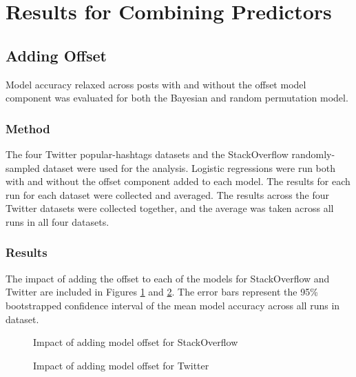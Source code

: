 \documentclass[man,floatsintext,donotrepeattitle]{apa6}
\begin{document}
\section{Results for Combining Predictors}

\subsection{Adding Offset}

Model accuracy relaxed across posts with and without the offset model component was evaluated for both the Bayesian and random permutation model.

\subsubsection{Method}

The four Twitter popular-hashtags datasets and the StackOverflow randomly-sampled dataset were used for the analysis.
Logistic regressions were run both with and without the offset component added to each model.
The results for each run for each dataset were collected and averaged.
The results across the four Twitter datasets were collected together, and the average was taken across all runs in all four datasets.

\subsubsection{Results}

The impact of adding the offset to each of the models for StackOverflow and Twitter are included in Figures \ref{figContextOffsetSO} and \ref{figContextOffsetT}.
The error bars represent the 95\% bootstrapped confidence interval of the mean model accuracy across all runs in dataset.

\begin{figure}[!htbp]
  \caption{Impact of adding model offset for StackOverflow}
  \label{figContextOffsetSO}
\end{figure}

\begin{figure}[!htbp]
  \caption{Impact of adding model offset for Twitter}
  \label{figContextOffsetT}
\end{figure}
\end{document}
